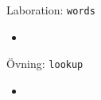 


\begin{Slide}{Laboration: \texttt{words}}
\begin{itemize}
  \item
\end{itemize}
\end{Slide}



\begin{Slide}{Övning: \texttt{lookup}}
\begin{itemize}
  \item
\end{itemize}
\end{Slide}
